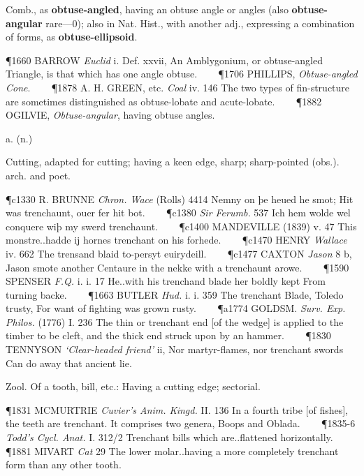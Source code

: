 \begin{description}[wide, labelwidth=!, labelindent=0pt]
\begin{myenumerate}
 Comb., as \textbf{obtuse-angled}, having an obtuse angle or angles (also \textbf{obtuse-angular}
rare—0); also in Nat. Hist., with another adj., expressing a combination of forms, as 
\textbf{obtuse-ellipsoid}.

\P 1660 BARROW  \textit{Euclid} i. Def. xxvii, An Amblygonium, or obtuse-angled Triangle, is that which has one angle obtuse.    
\P 1706 PHILLIPS,  \textit{Obtuse-angled Cone}.    
\P 1878 A. H. GREEN,  etc. \textit{Coal} iv. 146 The two types of fin-structure are sometimes distinguished as obtuse-lobate and acute-lobate.    
\P 1882 OGILVIE,  \textit{Obtuse-angular}, having obtuse angles.
\end{myenumerate}

 a. (n.)

\noindent {}

\vspace{-0.3cm}

\begin{myenumerate}

 Cutting, adapted for cutting; having a keen edge, sharp; sharp-pointed (obs.). arch. and poet.

\P c1330 R. BRUNNE  \textit{Chron. Wace} (Rolls) 4414 Nemny on þe heued he smot; Hit was trenchaunt, ouer fer hit bot.    
\P c1380  \textit{Sir Ferumb.} 537 Ich hem wolde wel conquere wiþ my swerd trenchaunt.    
\P c1400 MANDEVILLE (1839) v. 47 This monstre..hadde ij hornes trenchant on his forhede.    
\P c1470 HENRY  \textit{Wallace} iv. 662 The trensand blaid to-persyt euirydeill.    
\P c1477 CAXTON  \textit{Jason} 8 b, Jason smote another Centaure in the nekke with a trenchaunt arowe.    
\P 1590 SPENSER  \textit{F.Q.} i. i. 17 He..with his trenchand blade her boldly kept From turning backe.    
\P 1663 BUTLER  \textit{Hud.} i. i. 359 The trenchant Blade, Toledo trusty, For want of fighting was grown rusty.    
\P a1774 GOLDSM.  \textit{Surv. Exp. Philos.} (1776) I. 236 The thin or trenchant end [of the wedge] is applied to the timber to be cleft, and the thick end struck upon by an hammer.    
\P 1830 TENNYSON  \textit{‘Clear-headed friend’} ii, Nor martyr-flames, nor trenchant swords Can do away that ancient lie.

 Zool. Of a tooth, bill, etc.: Having a cutting edge; sectorial.

\P 1831 MCMURTRIE  \textit{Cuvier's Anim. Kingd.} II. 136 In a fourth tribe [of fishes], the teeth are trenchant. It comprises two genera, Boops and Oblada.    
\P 1835-6 \textit{Todd's  Cycl. Anat.} I. 312/2 Trenchant bills which are..flattened horizontally.    
\P 1881 MIVART  \textit{Cat} 29 The lower molar..having a more completely trenchant form than any other tooth.


\end{myenumerate}
\end{description}
